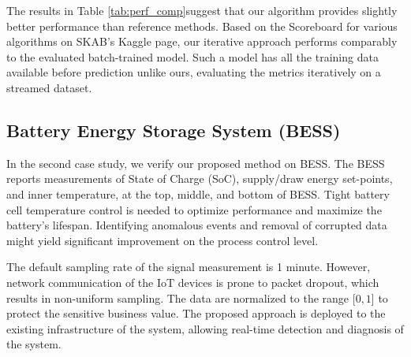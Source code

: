 The results in Table \ref{tab:perf_comp}suggest that our algorithm provides slightly better performance than reference methods. Based on the Scoreboard for various algorithms on SKAB's Kaggle page, our iterative approach performs comparably to the evaluated batch-trained model. Such a model has all the training data available before prediction unlike ours, evaluating the metrics iteratively on a streamed dataset.

\subsection{Battery Energy Storage System (BESS)}\label{AA:BESS}
In the second case study, we verify our proposed method on BESS. The BESS reports measurements of State of Charge (SoC), supply/draw energy set-points, and inner temperature, at the top, middle, and bottom of BESS. Tight battery cell temperature control is needed to optimize performance and maximize the battery's lifespan. Identifying anomalous events and removal of corrupted data might yield significant improvement on the process control level. 

The default sampling rate of the signal measurement is 1 minute. However, network communication of the IoT devices is prone to packet dropout, which results in non-uniform sampling. The data are normalized to the range $[0, 1$] to protect the sensitive business value. The proposed approach is deployed to the existing infrastructure of the system, allowing real-time detection and diagnosis of the system.

